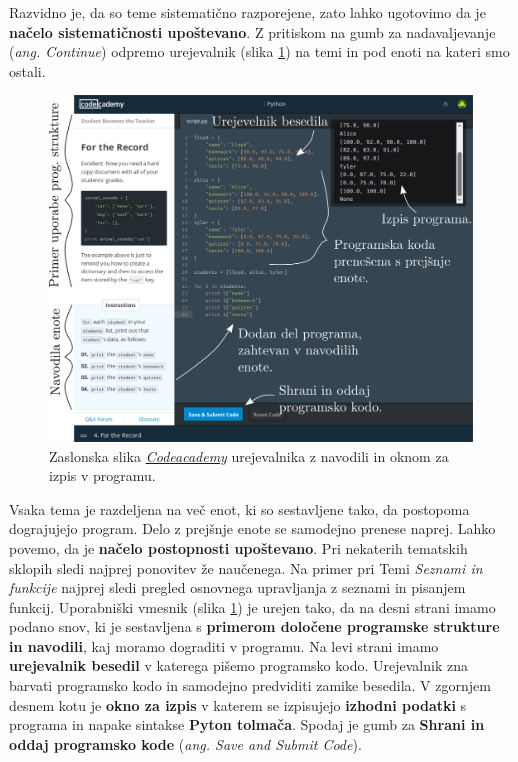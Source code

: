 Razvidno je, da so teme sistematično razporejene, zato lahko ugotovimo
da je \textbf{načelo sistematičnosti upoštevano}. Z pritiskom na gumb
za nadavaljevanje (\emph{ang. Continue}) odpremo urejevalnik (slika
\ref{fig:scr:web:codeacademy:ide}) na temi in pod enoti na kateri smo
ostali.

\begin{figure}[h!]
  \centering
    \includegraphics [width=0.65\linewidth, keepaspectratio =
   1] {./images/sc_web/codeacademy_IDE_02.png}
   \caption{Zaslonska slika
     \emph{\href{https://www.codecademy.com/}{Codeacademy}}
     \cite{web:codeacademy} urejevalnika z navodili in oknom za izpis
     v programu.}
    \label{fig:scr:web:codeacademy:ide}
\end{figure}

Vsaka tema je razdeljena na več enot, ki so sestavljene tako, da
postopoma dograjujejo program. Delo z prejšnje enote se samodejno
prenese naprej. Lahko povemo, da je \textbf{načelo postopnosti
upoštevano}. Pri nekaterih tematskih sklopih sledi najprej ponovitev že
naučenega. Na primer pri Temi \emph{Seznami in funkcije} najprej sledi
pregled osnovnega upravljanja z seznami in pisanjem funkcij.
Uporabniški vmesnik (slika \ref{fig:scr:web:codeacademy:ide}) je
urejen tako, da na desni strani imamo podano snov, ki je sestavljena s
\textbf{primerom določene programske strukture in navodili}, kaj
moramo dograditi v programu. Na levi strani imamo \textbf{urejevalnik
  besedil} v katerega pišemo programsko kodo. Urejevalnik zna barvati
programsko kodo in samodejno predviditi zamike besedila. V zgornjem
desnem kotu je \textbf{okno za izpis} v katerem se izpisujejo
\textbf{izhodni podatki} s programa in napake sintakse \textbf{Pyton
  tolmača}. Spodaj je gumb za \textbf{Shrani in oddaj programsko kode}
(\emph{ang. Save and Submit Code}).

